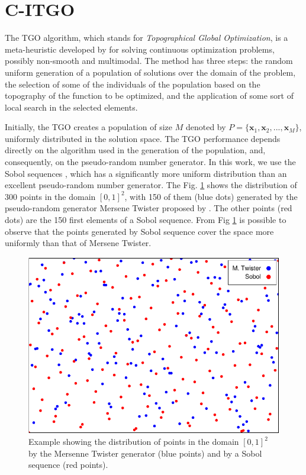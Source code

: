 \section{C-ITGO}\label{sec:Methods}

The TGO algorithm, which stands for \textit{Topographical Global Optimization}, is a meta-heuristic developed by \cite{ITGO1} for solving continuous optimization problems, possibly non-smooth and multimodal. The method has three steps: the random uniform generation of a population of solutions over the domain of the problem, the selection of some of the individuals of the population based on the topography of the function to be optimized, and the application of some sort of local search in the selected elements.


Initially, the TGO creates a population of size $M$ denoted by $P = \{\bm{x}_1, \bm{x}_2, ..., \allowbreak \bm{x}_M\}$, uniformly distributed in the solution space. The TGO performance depends directly on the algorithm used in the generation of the population, and, consequently, on the pseudo-random number generator. In this work, we use the Sobol sequences \cite{Sobol, ITGO3}, which has a significantly more uniform distribution than an excellent pseudo-random number generator. The Fig. \ref{fig:Sobol} shows the distribution of 300 points in the domain $[0, 1]^2$, with 150 of them (blue dots) generated by the pseudo-random generator Mersene Twister proposed by \cite{mt19937}. The other points (red dots) are the 150 first elements of a Sobol sequence. From Fig \ref{fig:Sobol} is possible to observe that the points generated by Sobol sequence cover the space more uniformly than that of Mersene Twister.


\begin{figure}[h]
\begin{center}
\includegraphics[scale=0.8]{scatter-crop.pdf}
\end{center}
\captionsetup{justification=centering}
\caption{Example showing the distribution of points in the domain $[0, 1]^2$ by the Mersenne Twister generator (blue points) and by a Sobol sequence (red points). }\label{fig:Sobol}
\end{figure}


